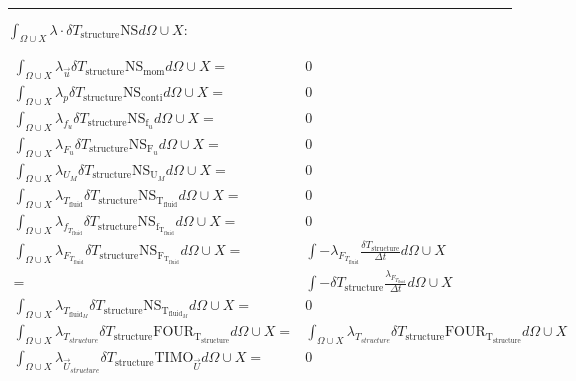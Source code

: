 \documentclass[10pt]{article} %
\begin{document}
\begin{center}
\begin{align*}
\end{align*}
\noindent\rule[1ex]{\textwidth}{1pt}
\begin{flushleft}
	$\int_{\Omega \cup X} \lambda \cdot \delta T_{\text{structure}} \text{NS}d\Omega \cup X :$
\end{flushleft}
\begin{align*}
	\int_{\Omega \cup X} \lambda_{\vec{u}} \delta T_{\text{structure}} \text{NS}_{\text{mom}} d\Omega \cup X =&  0\\
	\int_{\Omega \cup X} \lambda_p \delta T_{\text{structure}} \text{NS}_{\text{conti}} d\Omega \cup X =& 0\\
	\int_{\Omega \cup X} \lambda_{f_u} \delta T_{\text{structure}} \text{NS}_{\text{f}_u} d\Omega \cup X =& 0\\
	\int_{\Omega \cup X} \lambda_{F_u} \delta T_{\text{structure}} \text{NS}_{\text{F}_u} d\Omega \cup X =& 0\\
	\int_{\Omega \cup X} \lambda_{U_M} \delta T_{\text{structure}} \text{NS}_{\text{U}_M} d\Omega \cup X =& 0\\
	\int_{\Omega \cup X} \lambda_{T_{\text{fluid}}} \delta T_{\text{structure}} \text{NS}_{\text{T}_{\text{fluid}}} d\Omega \cup X =& 0\\
	\int_{\Omega \cup X} \lambda_{f_{T_{\text{fluid}}}} \delta T_{\text{structure}} \text{NS}_{\text{f}_{\text{T}_{\text{fluid}}}} d\Omega \cup X =& 0\\
	\int_{\Omega \cup X} \lambda_{F_{T_{\text{fluid}}}} \delta T_{\text{structure}} \text{NS}_{\text{F}_{\text{T}_{\text{fluid}}}} d\Omega \cup X 
	=& \int -  \lambda_{F_{T_{\text{fluid}}}} \frac{\delta T_{\text{structure}}}{\Delta t} d\Omega \cup X\\
	=& \int - \delta T_{\text{structure}}\frac{ \lambda_{F_{T_{\text{fluid}}}} }{\Delta t} d\Omega \cup X\\
	\int_{\Omega \cup X} \lambda_{T_{\text{fluid}_M}} \delta T_{\text{structure}} \text{NS}_{\text{T}_{\text{fluid}_M}} d\Omega \cup X =& 0\\
	\int_{\Omega \cup X} \lambda_{T_{structure}} \delta T_{\text{structure}} \text{FOUR}_{\text{T}_{\text{structure}}} d\Omega \cup X =& \int_{\Omega \cup X} \lambda_{T_{structure}} \delta T_{\text{structure}} \text{FOUR}_{\text{T}_{\text{structure}}} d\Omega \cup X\\
	\int_{\Omega \cup X} \lambda_{\vec{U}_{structure}} \delta T_{\text{structure}} \text{TIMO}_{\vec{U}} d\Omega \cup X =& 0\\
\end{align*}

\end{center}
\end{document}
